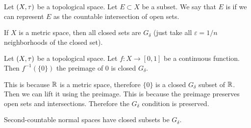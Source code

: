 \begin{definition}
Let $(X,\tau)$ be a topological space. Let $E\subset X$ be a
subset. We say that $E$ is  if we can represent
$E$ as the countable intersection of open sets.
\end{definition}

\begin{example}
If $X$ is a metric space, then all closed sets are $G_{\delta}$ (just
take all $\varepsilon=1/n$ neighborhoods of the closed set).
\end{example}

\begin{example}
Let $(X,\tau)$ be a topological space. Let $f\colon X\to[0,1]$
be a continuous function. Then $f^{-1}(\{0\})$ the preimage of $0$ is
closed $G_{\delta}$.

This is because $\mathbb{R}$ is a metric space, therefore $\{0\}$ is a closed
$G_{\delta}$ subset of $\mathbb{R}$. Then we can lift it using the
preimage. This is because the preimage preserves open sets and
intersections. Therefore the $G_{\delta}$ condition is preserved.
\end{example}

\begin{lemma}
Second-countable normal spaces have closed subsets be $G_{\delta}$.
\end{lemma}
